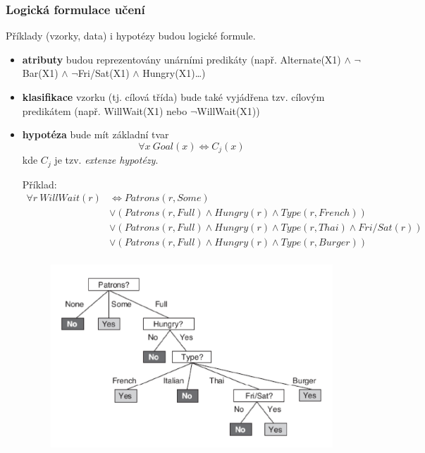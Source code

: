 \documentclass[11pt]{report} %
\numberwithin{equation}{section}
\begin{document}
\subsubsection{Logická formulace učení}
Příklady (vzorky, data) i hypotézy budou logické formule. 
\begin{itemize}
\item \textbf{atributy} budou reprezentovány unárními predikáty (např. Alternate(X1) $\wedge$ $\lnot$Bar(X1) $\wedge$ $\lnot$Fri/Sat(X1) $\wedge$ Hungry(X1)\dots)

\item \textbf{klasifikace} vzorku (tj. cílová třída) bude také vyjádřena tzv. cílovým predikátem (např. WillWait(X1) nebo $\lnot$WillWait(X1))

\item \textbf{hypotéza} bude mít základní tvar 
$$\forall x\ Goal(x) \Leftrightarrow C_j(x)$$
kde $C_j$ je tzv. \textit{extenze hypotézy}.

Příklad: 
\begin{align*}
\forall r\ WillWait(r) &\Leftrightarrow Patrons(r,Some)\\
&\vee (Patrons(r,Full) \wedge Hungry(r) \wedge Type(r,French))\\
&\vee (Patrons(r,Full) \wedge Hungry(r) \wedge Type(r,Thai) \wedge Fri/Sat(r))\\
&\vee (Patrons(r,Full) \wedge Hungry(r) \wedge Type(r,Burger))\\
\end{align*}
\begin{figure}[H]
	\centering
	\includegraphics[scale=0.6]{img/logic_learning.png}
\end{figure}

\end{itemize}
\end{document}
